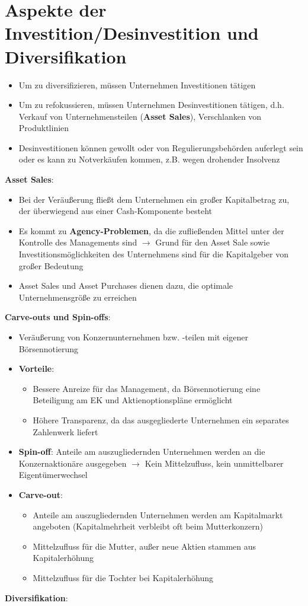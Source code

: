 \section{Aspekte der Investition/Desinvestition und Diversifikation}
\begin{itemize}
	\item Um zu diversifizieren, müssen Unternehmen Investitionen tätigen
	\item Um zu refokussieren, müssen Unternehmen Desinvestitionen tätigen, d.h. Verkauf von Unternehmensteilen (\textbf{Asset Sales}), Verschlanken von Produktlinien
	\item Desinvestitionen können gewollt oder von Regulierungsbehörden auferlegt sein oder es kann zu Notverkäufen kommen, z.B. wegen drohender Insolvenz
\end{itemize}
\bigskip
\textbf{Asset Sales}:
\begin{itemize}
	\item Bei der Veräußerung fließt dem Unternehmen ein großer Kapitalbetrag zu, der überwiegend aus einer Cash-Komponente besteht
	\item Es kommt zu \textbf{Agency-Problemen}, da die zufließenden Mittel unter der Kontrolle des Managements sind
	$\rightarrow$ Grund für den Asset Sale sowie Investitionsmöglichkeiten des Unternehmens sind für die Kapitalgeber von großer Bedeutung
	\item Asset Sales und Asset Purchases dienen dazu, die optimale Unternehmensgröße zu erreichen
\end{itemize}

\textbf{Carve-outs und Spin-offs}:
\begin{itemize}
	\item Veräußerung von Konzernunternehmen bzw. -teilen mit eigener Börsennotierung
	\item \textbf{Vorteile}: 
	\begin{itemize}
		\item Bessere Anreize für das Management, da Börsennotierung eine Beteiligung am EK und Aktienoptionspläne ermöglicht
		\item Höhere Transparenz, da das ausgegliederte Unternehmen ein separates Zahlenwerk liefert
	\end{itemize}
	\item \textbf{Spin-off}: Anteile am auszugliedernden Unternehmen werden an die Konzernaktionäre ausgegeben $\rightarrow$ Kein Mittelzufluss, kein unmittelbarer Eigentümerwechsel
	\item \textbf{Carve-out}: 
	\begin{itemize}
		\item Anteile am auszugliedernden Unternehmen werden  am Kapitalmarkt angeboten (Kapitalmehrheit verbleibt oft beim Mutterkonzern)
		\item Mittelzufluss für die Mutter, außer neue Aktien stammen aus Kapitalerhöhung
		\item Mittelzufluss für die Tochter bei Kapitalerhöhung
	\end{itemize}
\end{itemize}
\bigskip
\textbf{Diversifikation}:



